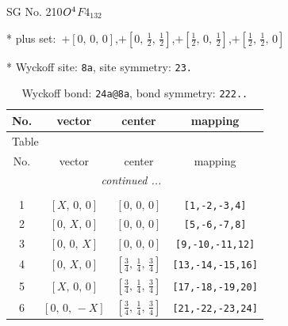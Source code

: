\documentclass[fleqn,8pt]{jsarticle}
\begin{document}
\setcounter{MaxMatrixCols}{32}

\renewcommand{\tablename}{Table~}
\renewcommand{\figurename}{Figure~}
\begin{center}
\LARGE
SG No. 210\quad$O_{\rm }^{4}$\quad$F4_132$\quad[ cubic ]
\end{center}

* plus set:\,\,\,$+\left[ 0,\, 0,\, 0 \right]$,\quad $+\left[ 0,\, \frac{1}{2},\, \frac{1}{2} \right]$,\quad $+\left[ \frac{1}{2},\, 0,\, \frac{1}{2} \right]$,\quad $+\left[ \frac{1}{2},\, \frac{1}{2},\, 0 \right]$


* Wyckoff site: {\tt 8a}, site symmetry: {\tt 23.}
\renewcommand{\arraystretch}{1.2}
\begin{longtable}{cccc}
\caption{Wyckoff bond: {\tt 24a@8a}, bond symmetry: {\tt 222..}}
 \\
 \hline \hline
No. & vector & center & mapping \\ \hline \endfirsthead

\multicolumn{3}{l}{\tablename\ \thetable{}} \\
 \hline \hline
No. & vector & center & mapping \\ \hline \endhead

 \hline \hline
\multicolumn{3}{r}{\footnotesize\it continued ...} \\ \endfoot

 \hline \hline
\multicolumn{3}{r}{} \\ \endlastfoot

1 & $\left[ X,\, 0,\, 0 \right]$ & $\left[ 0,\, 0,\, 0 \right]$ & {\tt [1,-2,-3,4]} \\ \hline
2 & $\left[ 0,\, X,\, 0 \right]$ & $\left[ 0,\, 0,\, 0 \right]$ & {\tt [5,-6,-7,8]} \\ \hline
3 & $\left[ 0,\, 0,\, X \right]$ & $\left[ 0,\, 0,\, 0 \right]$ & {\tt [9,-10,-11,12]} \\ \hline
4 & $\left[ 0,\, X,\, 0 \right]$ & $\left[ \frac{3}{4},\, \frac{1}{4},\, \frac{3}{4} \right]$ & {\tt [13,-14,-15,16]} \\ \hline
5 & $\left[ X,\, 0,\, 0 \right]$ & $\left[ \frac{3}{4},\, \frac{1}{4},\, \frac{3}{4} \right]$ & {\tt [17,-18,-19,20]} \\ \hline
6 & $\left[ 0,\, 0,\, - X \right]$ & $\left[ \frac{3}{4},\, \frac{1}{4},\, \frac{3}{4} \right]$ & {\tt [21,-22,-23,24]} \\
\end{longtable}
\renewcommand{\arraystretch}{1.2}
\end{document}
